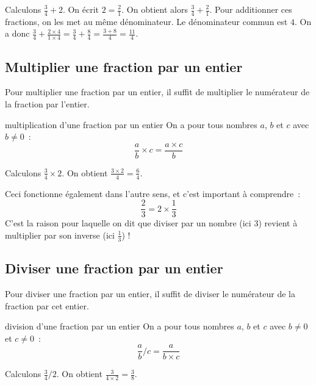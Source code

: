 \documentclass[12pt]{article}
\begin{document}
\begin{exemple}{}{}
    Calculons $\frac{3}{4} + 2$. On écrit $2 = \frac{2}{1}$. On obtient alors $\frac{3}{4} + \frac{2}{1}$. Pour additionner ces fractions, on les met au même dénominateur. Le dénominateur commun est $4$. On a donc $\frac{3}{4} + \frac{2 \times 4}{1 \times 4} = \frac{3}{4} + \frac{8}{4} = \frac{3 + 8}{4} = \frac{11}{4}$.
\end{exemple}

\subsection{Multiplier une fraction par un entier}

Pour multiplier une fraction par un entier, il suffit de multiplier le numérateur de la fraction par l'entier.

\begin{proposition}{}{multiplication d'une fraction par un entier}
    On a pour tous nombres $a$, $b$ et $c$ avec $b \neq 0$~:
    $$\frac{a}{b} \times c = \frac{a \times c}{b}$$
\end{proposition}

\begin{exemple}{}{}
    Calculons $\frac{3}{4} \times 2$. On obtient $\frac{3 \times 2}{4} = \frac{6}{4}$.
\end{exemple}

\begin{remarque}{}{}
    Ceci fonctionne également dans l'autre sens, et c'est important à comprendre~:
    $$\frac{2}{3} = 2 \times \frac{1}{3}$$
    C'est la raison pour laquelle on dit que diviser par un nombre (ici $3$) revient à multiplier par son inverse (ici $\frac{1}{3}$) !
\end{remarque}


\subsection{Diviser une fraction par un entier}

Pour diviser une fraction par un entier, il suffit de diviser le numérateur de la fraction par cet entier.

\begin{proposition}{}{division d'une fraction par un entier}
    On a pour tous nombres $a$, $b$ et $c$ avec $b \neq 0$ et $c \neq 0$~:
    $$\frac{a}{b} / c = \frac{a}{b \times c}$$
\end{proposition}

\begin{exemple}{}{}
    Calculons $\frac{3}{4} / 2$. On obtient $\frac{3}{4 \times 2} = \frac{3}{8}$.
\end{exemple}
\end{document}

